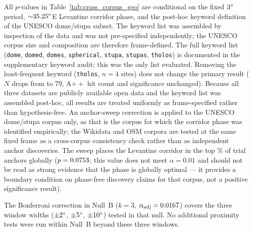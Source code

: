 \documentclass[12pt,a4paper]{article}
\newcommand{\degr}{\ifmmode^\circ\else\textdegree{}\fi}
\begin{document}
All $p$-values in Table~\ref{tab:cross_corpus_geo} are conditional on
the fixed $3\degr$ period, ${\sim}35.25\degr$E Levantine corridor
phase, and the post-hoc keyword definition of the UNESCO dome/stupa
subset. The keyword list was assembled by inspection of the data and
was not pre-specified independently; the UNESCO corpus size and
composition are therefore frame-defined. The full keyword list
(\texttt{dome}, \texttt{domed}, \texttt{domes}, \texttt{spherical},
\texttt{stupa}, \texttt{stupas}, \texttt{tholos}) is documented in the
supplementary keyword audit; this was the only list evaluated. Removing
the least-frequent keyword (\texttt{tholos}, $n = 4$ sites) does not
change the primary result ($N$ drops from \circTwoSampNDome{} to 79,
A$++$ hit count and significance unchanged). Because all three datasets
are publicly available open data and the keyword list was assembled
post-hoc, all results are treated uniformly as frame-specified rather
than hypothesis-free. An anchor-sweep correction is applied to the
UNESCO dome/stupa corpus only, as that is the corpus for which the
corridor phase was identified empirically; the Wikidata and OSM corpora
are tested at the same fixed frame as a cross-corpus consistency check
rather than as independent anchor discoveries. The sweep
places the Levantine corridor in the
top \anchorSweepTopPct\% of \anchorSweepNanchors{} trial anchors
globally ($p = 0.0753{}$; this value does not meet $\alpha = 0.01$
and should not be read as strong evidence that the phase is globally
optimal --- it provides a boundary condition on phase-free discovery
claims for that corpus, not a positive significance result).

The Bonferroni correction in Null~B ($k = 3$, $\alpha_\mathrm{adj} =
0.0167{}$) covers the three window widths (${\pm}2\degr$,
${\pm}5\degr$, ${\pm}10\degr$) tested in that null. No additional
proximity tests were run within Null~B beyond these three windows.
\end{document}
